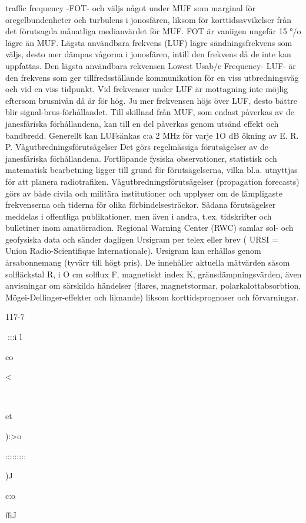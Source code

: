 traffic frequency -FOT- och väljs något under MUF som marginal för oregelbundenheter och turbulens i jonosfären, liksom för
korttidsavvikelser från det förutsagda månatliga medianvärdet för MUF. FOT är vaniigen ungefär 15 °/o lägre än MUF.
Lägsta användbara frekvens (LUF)
lägre sändningsfrekvens som väljs, desto
mer dämpas vågorna i jonosfären, intill den
frekvens då de inte kan uppfattas. Den lägsta användbara rekvensen Lowest Usab/e
Frequency- LUF- är den frekvens som ger
tillfredsställande kommunikation för en viss
utbredningsväg och vid en viss tidpunkt.
Vid frekvenser under LUF är mottagning
inte möjlig eftersom brusnivån då är för hög.
Ju mer frekvensen höjs över LUF, desto
bättre blir signal-brus-förhållandet.
Till skillnad från MUF, som endast påverkas av de janesfäriska förhållandena, kan
till en del påverkas genom utsänd effekt
och bandbredd. Generellt kan LUFsänkas
c:a 2 MHz för varje 1O dB ökning av E. R. P.
Vågutbredningsförutsägelser
Det görs regelmässiga förutsägelser av de
janesfäriska förhållandena. Fortlöpande fysiska observationer, statistisk och matematisk bearbetning ligger till grund för förutsägelserna, vilka bl.a. utnyttjas för att planera
radiotrafiken. Vågutbredningsförutsägelser
(propagation forecasts) görs av både civila
och militära institutioner och upplyser om de
lämpligaste frekvenserna och tiderna för olika förbindelsesträckor. Sådana förutsägelser meddelas i offentliga publikationer, men
även i andra, t.ex. tidskrifter och bulletiner
inom amatörradion.
Regional Warning Center (RWC) samlar
sol- och geofysiska data och sänder dagligen Ursigram per telex eller brev ( URSI =
Union Radio-Scientifique lnternationale).
Ursigram kan erhållas genom årsabonnemang (tyvärr till högt pris). De innehåller
aktuella mätvärden såsom solfläckstal R, i O
cm solflux F, magnetiskt index K, gränsdämpningsvärden, även anvisningar om särskilda händelser (flares,
magnetstormar, polarkalottabsorbtion, Mögei-Dellinger-effekter och liknande) liksom
korttidsprognoser och förvarningar.

117-7

:::i
l

co

<

~

et

):>o

:::::::::

)J

c:o

ffiJ

~

